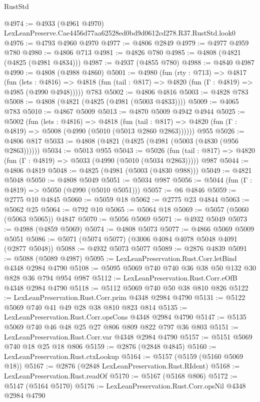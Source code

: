 \begin{lexlean}{RustStd}
\begin{coremodule}
@4974 := @4933 (@4961 @4970) LexLeanPreserve.Cae4456d77aa62528ed0bd9d0612cd278.R37.RustStd.look0
@4976 := @4793 @4960 @4970
@4977 := @4806 @2849
@4979 := @4977 @4959 @780
@4980 := @4806 @713
@4981 := @4826 @780
@4985 := @4808 (@4821 (@4825 (@4981 @4834)))
@4987 := @4937 (@4855 @780)
@4988 := @4840 @4987
@4990 := @4808 (@4988 @4860)
@5001 := @4980
    (fun (rty : @713) =>
    @4817
      (fun (lets : @4816) =>
      @4818 (fun (tail : @817) => @4820 (fun (Γ : @4819) => @4985 (@4990 @4948)))))
    @783
@5002 := @4806 @4816
@5003 := @4828 @783
@5008 := @4808 (@4821 (@4825 (@4981 (@5003 @4833))))
@5009 := @4065 @783
@5010 := @4867 @5009
@5013 := @4870 @5009 @4942 @4944
@5025 := @5002
    (fun (lets : @4816) =>
    @4818
      (fun (tail : @817) => @4820 (fun (Γ : @4819) => @5008 (@4990 (@5010 (@5013 @2860 @2863))))))
    @955
@5026 := @4806 @817
@5033 := @4808 (@4821 (@4825 (@4981 (@5003 (@4830 (@956 @2863))))))
@5034 := @5013 @955
@5043 := @5026
    (fun (tail : @817) => @4820 (fun (Γ : @4819) => @5033 (@4990 (@5010 (@5034 @2863)))))
    @987
@5044 := @4806 @4819
@5048 := @4825 (@4981 (@5003 (@4830 @988)))
@5049 := @4821 @5048
@5050 := @4808 @5049
@5051 := @5034 @987
@5056 := @5044 (fun (Γ : @4819) => @5050 (@4990 (@5010 @5051)))
@5057 := @6 @4846
@5059 := @2775 @10 @4845
@5060 := @5059 @18
@5062 := @2775 @23 @4844
@5063 := @5062 @25
@5064 := @792 @10
@5065 := @5064 @18
@5069 := @5057 (@5060 (@5063 @5065)) @4847
@5070 := @5056 @5069
@5071 := @4932 @5049
@5073 := @4988 (@4859 @5069)
@5074 := @4808 @5073
@5077 := @4866 @5069 @5009 @5051
@5086 := @5071 (@5074 @5077) (@3006 @4084 @4078 @5048 @4091 (@2877 @5048))
@5088 := @4932 @5073 @5077
@5089 := @2876 @4839
@5091 := @5088 (@5089 @4987)
@5095 := LexLeanPreservation.Rust.Corr.letBind @4348 @2984 @4790
@5108 := @5095 @5069 @740 @740 @36 @38 @50 @132 @30 @828 @36 @794 @954 @987
@5112 := LexLeanPreservation.Rust.Corr.eOfB @4348 @2984 @4790
@5118 := @5112 @5069 @740 @50 @38 @810 @826
@5122 := LexLeanPreservation.Rust.Corr.prim @4348 @2984 @4790
@5131 := @5122 @5069 @740 @41 @49 @28 @38 @810 @823 @814
@5135 := LexLeanPreservation.Rust.Corr.opsCons @4348 @2984 @4790
@5147 := @5135 @5069 @740 @46 @48 @25 @27 @806 @809 @822 @797 @36 @803
@5151 := LexLeanPreservation.Rust.Corr.var @4348 @2984 @4790
@5157 := @5151 @5069 @740 @18 @25 @18 @806
@5159 := @2876 (@2848 @4845)
@5160 := LexLeanPreservation.Rust.ctxLookup
@5164 := @5157 (@5159 (@5160 @5069 @18))
@5167 := @2876 (@2848 LexLeanPreservation.Rust.RIdent)
@5168 := LexLeanPreservation.Rust.readOf
@5170 := @5167 (@5168 @806)
@5172 := @5147 (@5164 @5170)
@5176 := LexLeanPreservation.Rust.Corr.opsNil @4348 @2984 @4790

\end{coremodule}
\end{lexlean}
